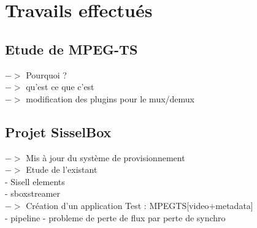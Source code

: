 \chapter{Travails effectués}

\section{Etude de MPEG-TS}
         $->$ Pourquoi ? \\
         $->$ qu'est ce que c'est\\
         $->$ modification des plugins pour le mux/demux\\

\section{Projet SisselBox}
         $->$ Mis à jour du système de provisionnement\\
         $->$ Etude de l'existant\\
             - Sisell elements\\
             - sboxstreamer\\
         $->$ Création d'un application Test : MPEGTS[video+metadata]\\
              - pipeline
              - probleme de perte de flux par perte de synchro
